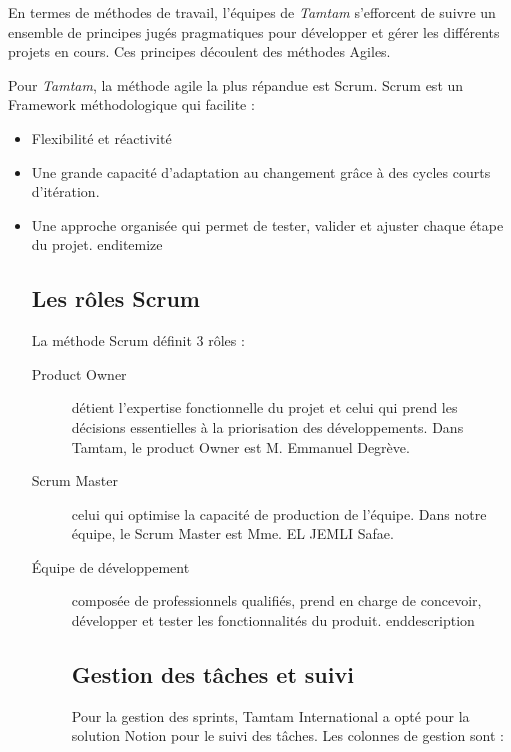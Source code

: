 \begin{itemize}
\begin{itemize}
\begin{itemize}
\begin{itemize}
\begin{itemize}
En termes de méthodes de travail, l'équipes de \textit{Tamtam} s'efforcent de suivre un ensemble de principes jugés pragmatiques pour développer et gérer les différents projets en cours. Ces principes découlent des méthodes Agiles.

Pour \textit{Tamtam}, la méthode agile la plus répandue est Scrum. Scrum est un Framework méthodologique qui facilite :

\begin{itemize}
    \item Flexibilité et réactivité
    \item Une grande capacité d'adaptation au changement grâce à des cycles courts d'itération.
    \item Une approche organisée qui permet de tester, valider et ajuster chaque étape du projet.
end{itemize}

\subsection{Les rôles Scrum}

La méthode Scrum définit 3 rôles :

\begin{description}
    \item[Product Owner] détient l'expertise fonctionnelle du projet et celui qui prend les décisions essentielles à la priorisation des développements. Dans Tamtam, le product Owner est M. Emmanuel Degrève.
    
    \item[Scrum Master] celui qui optimise la capacité de production de l'équipe. Dans notre équipe, le Scrum Master est Mme. EL JEMLI Safae.
    
    \item[Équipe de développement] composée de professionnels qualifiés, prend en charge de concevoir, développer et tester les fonctionnalités du produit.
end{description}

\subsection{Gestion des tâches et suivi}

Pour la gestion des sprints, Tamtam International a opté pour la solution Notion pour le suivi des tâches. Les colonnes de gestion sont :


\end{description}
\end{itemize}
\end{itemize}
\end{itemize}
\end{itemize}
\end{itemize}
\end{itemize}
